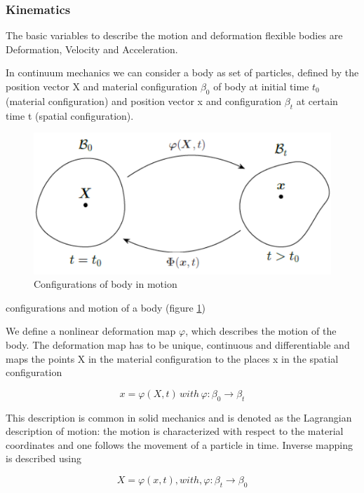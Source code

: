 \subsubsection{Kinematics \citep{FEM}}

The basic variables to describe the motion and deformation flexible
bodies are Deformation, Velocity and Acceleration. 

In continuum mechanics we can consider a body as set of particles,
defined by the position vector X and material configuration $\beta_{0}$
of body at initial time $t_{0}$ (material configuration)
and position vector x and configuration $\beta_{t}$
at certain time t (spatial configuration).

\begin{figure}[H]
    \centering
	\includegraphics[scale=0.25]{../images/potato.png}
	\caption{Configurations of body in motion}
	\label{fig:potato}
\end{figure}

configurations and motion of a body (figure \ref{fig:potato})

We define a nonlinear deformation map $\varphi$, which describes
the motion of the body. The deformation map has to be unique, continuous
and differentiable and maps the points X in the material configuration
to the places x in the spatial configuration 

\begin{equation}
x=\varphi(X,t)\,with\,\varphi\colon\beta_{0}\rightarrow\beta_{t}
\end{equation}


This description is common in solid mechanics and is denoted as the
Lagrangian description of motion: the motion is characterized with
respect to the material coordinates and one follows the movement of
a particle in time. Inverse mapping is described using 

\begin{equation}
X=\varphi(x,t) , with, \varphi: \beta_{t}\rightarrow\beta_{0}
\end{equation}


